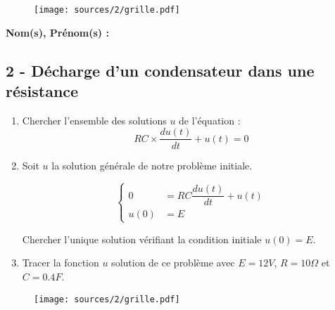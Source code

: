 \documentclass[12pt]{article}
\begin{document}
\begin{figure}[H]
  \centering
  \texttt{[image: sources/2/grille.pdf]}
\end{figure}

\newpage


\textbf{Nom(s), Prénom(s) :}

\subsection*{2 - Décharge d'un condensateur dans une résistance}



\begin{enumerate}
\item Chercher l'ensemble des solutions $u$ de l'équation :
  $$ RC \times \dfrac{du(t)}{dt} + u(t) = 0 $$

\item Soit $u$ la solution générale de notre problème initiale.

  \begin{equation*}
    \left\lbrace
    \begin{array}{ccc}
      0 &= RC\dfrac{du(t)}{dt} + u(t)\\
      u(0) &= E
    \end{array}\right.
  \end{equation*}


  Chercher l'unique solution vérifiant la condition initiale $u(0) = E$. 
\item Tracer la fonction $u$ solution de ce problème avec $E = 12V$, $R = 10\Omega$ et $C = 0.4F$.
\end{enumerate}

\begin{figure}[H]
  \centering
  \texttt{[image: sources/2/grille.pdf]}
\end{figure}
\end{document}
